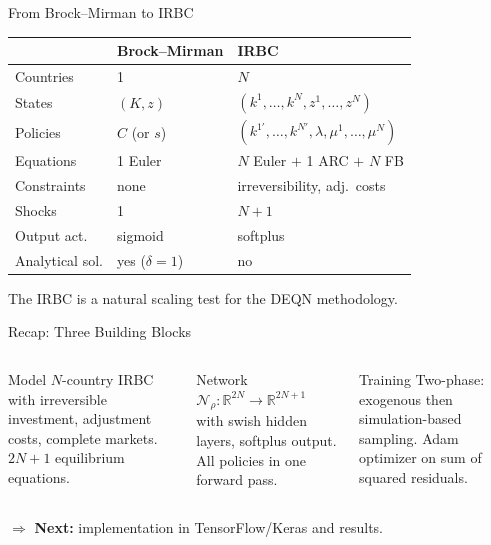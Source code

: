 \documentclass[aspectratio=169,11pt]{beamer}
\newcommand{\emphc}[1]{\textcolor{harvardcrimson}{#1}}
\newcommand{\R}{\mathbb{R}}
\begin{document}
\begin{frame}{From Brock--Mirman to IRBC}
\begin{center}
\begin{tabular}{lll}
\toprule
& \textbf{Brock--Mirman} & \textbf{IRBC} \\
\midrule
Countries & 1 & $N$ \\
States & $(K, z)$ & $(k^1, \ldots, k^N, z^1, \ldots, z^N)$ \\
Policies & $C$ (or $s$) & $(k^{1\prime}, \ldots, k^{N\prime}, \lambda, \mu^1, \ldots, \mu^N)$ \\
Equations & 1 Euler & $N$ Euler $+$ 1 ARC $+$ $N$ FB \\
Constraints & none & irreversibility, adj.\ costs \\
Shocks & 1 & $N+1$ \\
Output act. & sigmoid & softplus \\
Analytical sol. & yes ($\delta=1$) & no \\
\bottomrule
\end{tabular}
\end{center}

\vspace{0.3em}
{\small The IRBC is a natural \emphc{scaling test} for the DEQN methodology.}
\end{frame}

\begin{frame}{Recap: Three Building Blocks}
\begin{columns}[T]
\begin{block}{Model}
\centering
\small
$N$-country IRBC with irreversible investment, adjustment costs, complete markets. $2N+1$ equilibrium equations.
\end{block}

\begin{block}{Network}
\centering
\small
$\mathcal{N}_\rho: \R^{2N} \to \R^{2N+1}$ with swish hidden layers, softplus output. All policies in one forward pass.
\end{block}

\begin{block}{Training}
\centering
\small
Two-phase: exogenous then simulation-based sampling. Adam optimizer on sum of squared residuals.
\end{block}
\end{columns}

\vspace{0.8em}
\begin{center}
$\Rightarrow$ \textbf{Next:} implementation in TensorFlow/Keras and results.
\end{center}
\end{frame}
\end{document}
